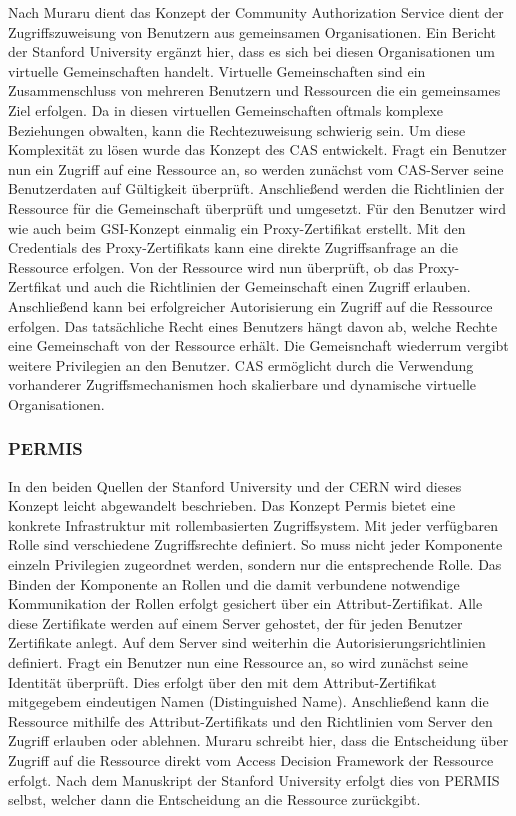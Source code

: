 \documentclass[utf8,biblatex]{lni}
\begin{document}
Nach Muraru \cite{Muraru.o.J} dient das Konzept der Community Authorization Service dient der Zugriffszuweisung von Benutzern aus gemeinsamen Organisationen. Ein Bericht der Stanford University \cite{Pearlman.28.03.2003} ergänzt hier, dass es sich bei diesen Organisationen
um virtuelle Gemeinschaften handelt. Virtuelle Gemeinschaften sind ein Zusammenschluss von mehreren Benutzern und Ressourcen die ein gemeinsames Ziel erfolgen. Da 
in diesen virtuellen Gemeinschaften oftmals komplexe Beziehungen obwalten, kann die Rechtezuweisung schwierig sein. Um diese Komplexität zu lösen wurde das Konzept des CAS entwickelt.
Fragt ein Benutzer nun ein Zugriff auf eine Ressource an, so werden zunächst vom CAS-Server seine Benutzerdaten auf Gültigkeit überprüft. Anschließend werden die Richtlinien der Ressource für die Gemeinschaft überprüft und 
umgesetzt. Für den Benutzer wird wie auch beim GSI-Konzept einmalig ein Proxy-Zertifikat erstellt. Mit den Credentials des Proxy-Zertifikats kann eine direkte Zugriffsanfrage 
an die Ressource erfolgen. Von der Ressource wird nun überprüft, ob das Proxy-Zertfikat und auch die Richtlinien der Gemeinschaft einen Zugriff erlauben. Anschließend kann bei
erfolgreicher Autorisierung ein Zugriff auf die Ressource erfolgen. Das tatsächliche Recht eines Benutzers hängt davon ab, welche Rechte eine Gemeinschaft von der Ressource erhält. Die Gemeisnchaft 
wiederrum vergibt weitere Privilegien an den Benutzer.  CAS ermöglicht durch die Verwendung vorhanderer Zugriffsmechanismen hoch skalierbare und dynamische virtuelle 
Organisationen. \cite{Pearlman.28.03.2003} \cite{Muraru.o.J}

\subsubsection{PERMIS}
In den beiden Quellen der Stanford University \cite{Pearlman.28.03.2003} und der CERN \cite{Muraru.o.J} wird dieses Konzept leicht abgewandelt beschrieben.
Das Konzept Permis bietet eine konkrete Infrastruktur mit rollembasierten Zugriffsystem. 
 Mit jeder verfügbaren Rolle sind verschiedene Zugriffsrechte definiert. So muss nicht jeder
Komponente einzeln Privilegien zugeordnet werden, sondern nur die entsprechende Rolle. Das Binden der Komponente an Rollen und die damit verbundene notwendige Kommunikation der Rollen 
erfolgt gesichert über ein Attribut-Zertifikat. Alle diese Zertifikate werden auf einem Server gehostet, der für jeden Benutzer Zertifikate anlegt. Auf dem Server sind weiterhin
die Autorisierungsrichtlinien definiert. Fragt ein Benutzer nun eine Ressource an, so wird
zunächst seine Identität überprüft. Dies erfolgt über den mit dem Attribut-Zertifikat mitgegebem eindeutigen Namen (Distinguished Name). Anschließend kann die Ressource mithilfe des Attribut-Zertifikats und den Richtlinien vom Server den Zugriff erlauben oder ablehnen. Muraru \cite{Muraru.o.J} schreibt hier, dass
die Entscheidung über Zugriff auf die Ressource direkt vom Access Decision Framework der Ressource erfolgt. Nach dem Manuskript der Stanford University \cite{Pearlman.28.03.2003} erfolgt dies von PERMIS selbst, welcher dann die Entscheidung an die Ressource zurückgibt.
\end{document}
